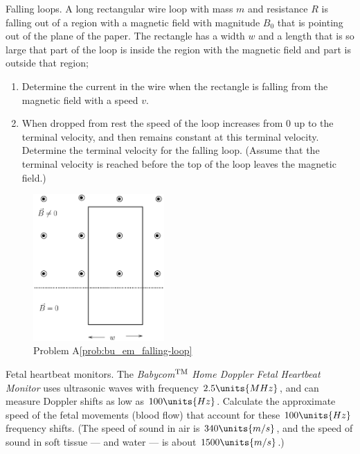 \begin{aproblem}{Falling loops.}  
  A long rectangular wire loop with mass $m$ and resistance $R$ is
  falling out of a region with a magnetic field with magnitude $B_0$
  that is pointing out of the plane of the paper.  The rectangle has a
  width $w$ and a length that is so large that part of the loop is
  inside the region with the magnetic field and part is outside that
  region;
  \begin{enumerate}
  \item Determine the current in the wire when the rectangle is
    falling from the magnetic field with a speed $v$.
  \item When dropped from rest the speed of the loop increases from
    $0$ up to the terminal velocity, and then remains constant at this
    terminal velocity.  Determine the terminal velocity for the
    falling loop.  (Assume that the terminal velocity is reached
    before the top of the loop leaves the magnetic field.)
  \end{enumerate}

  \begin{figure}[h]
    \begin{center}
      \includegraphics[width=5cm]{additional_problems/bu_em_falling-loop}
      \caption{Problem A\ref{prob:bu_em_falling-loop}}
    \end{center}
  \end{figure}
  \label{prob:bu_em_falling-loop}
\end{aproblem}


\begin{aproblem}{Fetal heartbeat monitors.}  
  The {\it Babycom}$^{\rm TM}$ {\it Home Doppler Fetal Heartbeat
    Monitor} uses ultrasonic waves with frequency $2.5\units{MHz}$,
  and can measure Doppler shifts as low as $100\units{Hz}$.  Calculate
  the approximate speed of the fetal movements (blood flow) that
  account for these $100\units{Hz}$ frequency shifts.  (The speed of
  sound in air is $340\units{m/s}$, and the speed of sound in soft
  tissue --- and water --- is about $1500\units{m/s}$.)
\end{aproblem}


